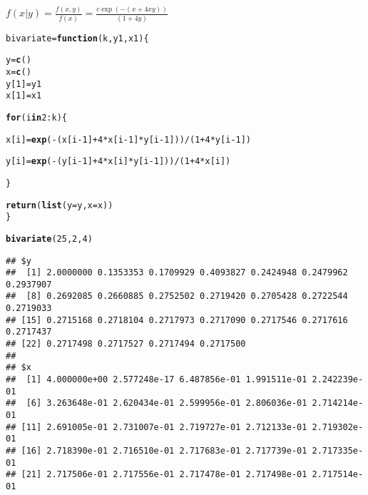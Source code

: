 \documentclass{article}\usepackage[]{graphicx}\usepackage[]{color}
\makeatletter
\newcommand{\hlnum}[1]{\textcolor[rgb]{0.686,0.059,0.569}{#1}}%
\newcommand{\hlopt}[1]{\textcolor[rgb]{0,0,0}{#1}}%
\newcommand{\hlstd}[1]{\textcolor[rgb]{0.345,0.345,0.345}{#1}}%
\newcommand{\hlkwa}[1]{\textcolor[rgb]{0.161,0.373,0.58}{\textbf{#1}}}%
\newcommand{\hlkwb}[1]{\textcolor[rgb]{0.69,0.353,0.396}{#1}}%
\newcommand{\hlkwc}[1]{\textcolor[rgb]{0.333,0.667,0.333}{#1}}%
\newcommand{\hlkwd}[1]{\textcolor[rgb]{0.737,0.353,0.396}{\textbf{#1}}}%
\newenvironment{kframe}{%
 \def\at@end@of@kframe{}%
 \ifinner\ifhmode%
  \def\at@end@of@kframe{\end{minipage}}%
  \begin{minipage}{\columnwidth}%
 \fi\fi%
 \def\FrameCommand##1{\hskip\@totalleftmargin \hskip-\fboxsep
 \colorbox{shadecolor}{##1}\hskip-\fboxsep
     \hskip-\linewidth \hskip-\@totalleftmargin \hskip\columnwidth}%
 \MakeFramed {\advance\hsize-\width
   \@totalleftmargin\z@ \linewidth\hsize
   \@setminipage}}%
 {\par\unskip\endMakeFramed%
 \at@end@of@kframe}
\newenvironment{knitrout}{}{} %
\makeatother
\begin{document}
$f(x|y)=\frac{f(x,y)}{f(x)}=\frac{c\exp(-(x+4xy))}{(1+4y)}$\\


\begin{knitrout}
\color{fgcolor}\begin{kframe}
\begin{alltt}
\hlstd{bivariate}\hlkwb{=} \hlkwa{function}\hlstd{(}\hlkwc{k}\hlstd{,}\hlkwc{y1}\hlstd{,}\hlkwc{x1}\hlstd{)\{}

  \hlstd{y}\hlkwb{=}\hlkwd{c}\hlstd{()}
  \hlstd{x}\hlkwb{=}\hlkwd{c}\hlstd{()}
  \hlstd{y[}\hlnum{1}\hlstd{]}\hlkwb{=}\hlstd{y1}
  \hlstd{x[}\hlnum{1}\hlstd{]}\hlkwb{=}\hlstd{x1}

  \hlkwa{for} \hlstd{(i} \hlkwa{in} \hlnum{2}\hlopt{:}\hlstd{k)\{}

    \hlstd{x[i]}\hlkwb{=}\hlkwd{exp}\hlstd{(}\hlopt{-}\hlstd{(x[i}\hlopt{-}\hlnum{1}\hlstd{]}\hlopt{+}\hlnum{4}\hlopt{*}\hlstd{x[i}\hlopt{-}\hlnum{1}\hlstd{]}\hlopt{*}\hlstd{y[i}\hlopt{-}\hlnum{1}\hlstd{]))}\hlopt{/}\hlstd{(}\hlnum{1}\hlopt{+}\hlnum{4}\hlopt{*}\hlstd{y[i}\hlopt{-}\hlnum{1}\hlstd{])}

    \hlstd{y[i]}\hlkwb{=}\hlkwd{exp}\hlstd{(}\hlopt{-}\hlstd{(y[i}\hlopt{-}\hlnum{1}\hlstd{]}\hlopt{+}\hlnum{4}\hlopt{*}\hlstd{x[i]}\hlopt{*}\hlstd{y[i}\hlopt{-}\hlnum{1}\hlstd{]))}\hlopt{/}\hlstd{(}\hlnum{1}\hlopt{+}\hlnum{4}\hlopt{*}\hlstd{x[i])}

  \hlstd{\}}


  \hlkwd{return}\hlstd{(}\hlkwd{list}\hlstd{(}\hlkwc{y}\hlstd{=y,}\hlkwc{x}\hlstd{=x))}
\hlstd{\}}

\hlkwd{bivariate}\hlstd{(}\hlnum{25}\hlstd{,}\hlnum{2}\hlstd{,}\hlnum{4}\hlstd{)}
\end{alltt}
\begin{verbatim}
## $y
##  [1] 2.0000000 0.1353353 0.1709929 0.4093827 0.2424948 0.2479962 0.2937907
##  [8] 0.2692085 0.2660885 0.2752502 0.2719420 0.2705428 0.2722544 0.2719033
## [15] 0.2715168 0.2718104 0.2717973 0.2717090 0.2717546 0.2717616 0.2717437
## [22] 0.2717498 0.2717527 0.2717494 0.2717500
## 
## $x
##  [1] 4.000000e+00 2.577248e-17 6.487856e-01 1.991511e-01 2.242239e-01
##  [6] 3.263648e-01 2.620434e-01 2.599956e-01 2.806036e-01 2.714214e-01
## [11] 2.691005e-01 2.731007e-01 2.719727e-01 2.712133e-01 2.719302e-01
## [16] 2.718390e-01 2.716510e-01 2.717683e-01 2.717739e-01 2.717335e-01
## [21] 2.717506e-01 2.717556e-01 2.717478e-01 2.717498e-01 2.717514e-01
\end{verbatim}
\end{kframe}
\end{knitrout}
\end{document}
